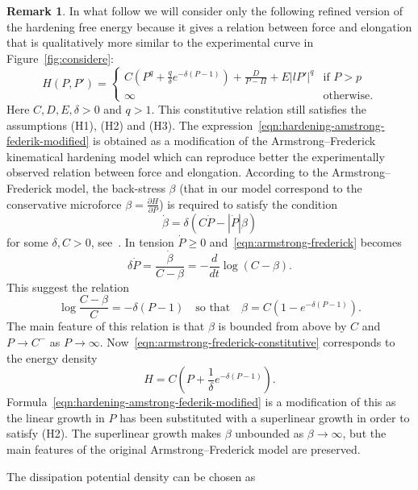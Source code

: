 \documentclass[a4paper,10pt,oneside]{amsbook}
\numberwithin{section}{chapter}
\numberwithin{equation}{chapter}
\theoremstyle{definition}
\newtheorem{rmk}[prop]{Remark}
\newcommand{\dind}[2]{\frac{\partial #1}{\partial #2}}
\begin{document}
\begin{rmk}
\label{rmk:am-fed}
In what follow we will consider only the following refined version of the hardening free energy because it gives a relation between force and elongation that is qualitatively more similar to the experimental curve in Figure~\ref{fig:considere}:
\begin{equation}
\label{eqn:hardening-amstrong-federik-modified}
H(P,P')=
\begin{cases}
C\left(P^q+\frac{q}{\delta}e^{-\delta(P-1)}\right)+\frac{D}{P-\Pi}+E|lP'|^q & \text{if $P>p$} \\
\infty & \text{otherwise}.
\end{cases}
\end{equation}
Here $C,D,E,\delta>0$ and $q>1$. This constitutive relation still satisfies the assumptions (H1), (H2) and (H3). The expression~\eqref{eqn:hardening-amstrong-federik-modified} is obtained as a modification of the Armstrong--Frederick kinematical hardening model which can reproduce better the experimentally observed relation between force and elongation. According to the Armstrong--Frederick model, the back-stress $\beta$ (that in our model correspond to the conservative microforce $\beta=\dind{H}{P}$) is required to satisfy the condition
\begin{equation}
\label{eqn:armstrong-frederick}
\dot\beta=\delta(C\dot P-|\dot P|\beta)
\end{equation}
for some $\delta,C>0$, see~\cite{steffranc}. In tension $\dot P\ge0$ and~\eqref{eqn:armstrong-frederick} becomes
\[
\delta\dot P=\frac{\dot\beta}{C-\beta}=-\frac{d}{dt}\log(C-\beta).
\]
This suggest the relation
\begin{equation}
\label{eqn:armstrong-frederick-constitutive}
\log\frac{C-\beta}{C}=-\delta(P-1)\quad\text{so that}\quad\beta=C(1-e^{-\delta(P-1)}).
\end{equation}
The main feature of this relation is that $\beta$ is bounded from above by $C$ and $P\to C^-$ as $P\to\infty$. Now~\eqref{eqn:armstrong-frederick-constitutive} corresponds to the energy density
\[
H=C\left(P+\frac{1}{\delta}e^{-\delta(P-1)}\right).
\]
Formula~\eqref{eqn:hardening-amstrong-federik-modified} is a modification of this as the linear growth in $P$ has been substituted with a superlinear growth in order to satisfy (H2). The superlinear growth makes $\beta$ unbounded as $\beta\to\infty$, but the main features of the original Armstrong--Frederick model are preserved.
\end{rmk}
The dissipation potential density can be chosen as
\end{document}
